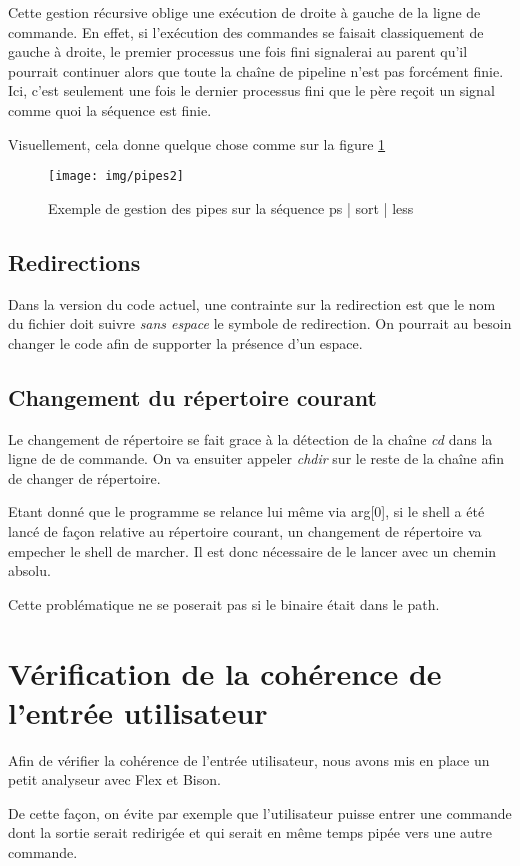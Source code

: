 \documentclass[fr]{article}
\begin{document}
Cette gestion récursive oblige une exécution de droite à gauche 
de la ligne de commande. En effet, si l'exécution des commandes se faisait classiquement de gauche à droite, le premier processus une fois fini signalerai au parent qu'il
pourrait continuer alors que toute la chaîne de pipeline n'est pas
forcément finie. Ici, c'est seulement une fois le dernier processus
fini que le père reçoit un signal comme quoi la séquence est finie.


Visuellement, cela donne quelque chose comme sur la figure \ref{pipe} 
\begin{figure}[!h]
\centering
  \texttt{[image: img/pipes2]}
  \caption{Exemple de gestion des pipes sur la séquence ps | sort | less}
\label{pipe}
\end{figure}


\subsection{Redirections}
Dans la version du code actuel, une contrainte sur la redirection est que le nom du fichier doit
suivre \emph{sans espace} le symbole de redirection. On pourrait
au besoin changer le code afin de supporter la présence d'un espace.

\subsection{Changement du répertoire courant}
Le changement de répertoire se fait grace à la détection de la
chaîne \emph{cd} dans la ligne de de commande. On va ensuiter appeler 
\emph{chdir} sur le reste de la chaîne afin de changer de répertoire.

Etant donné que le programme se relance lui même via arg[0], si le
shell a été lancé de façon relative au répertoire courant, un
changement de répertoire va empecher le shell de marcher. Il est donc
nécessaire de le lancer avec un chemin absolu.

Cette problématique ne se poserait pas si le binaire était dans le path.

\section{Vérification de la cohérence de l'entrée utilisateur}

Afin de vérifier la cohérence de l'entrée utilisateur, nous avons mis
en place un petit analyseur avec Flex et Bison.

De cette façon, on évite par exemple que l'utilisateur puisse entrer une commande 
dont la sortie serait redirigée et qui serait en même temps pipée vers
une autre commande.
\end{document}
